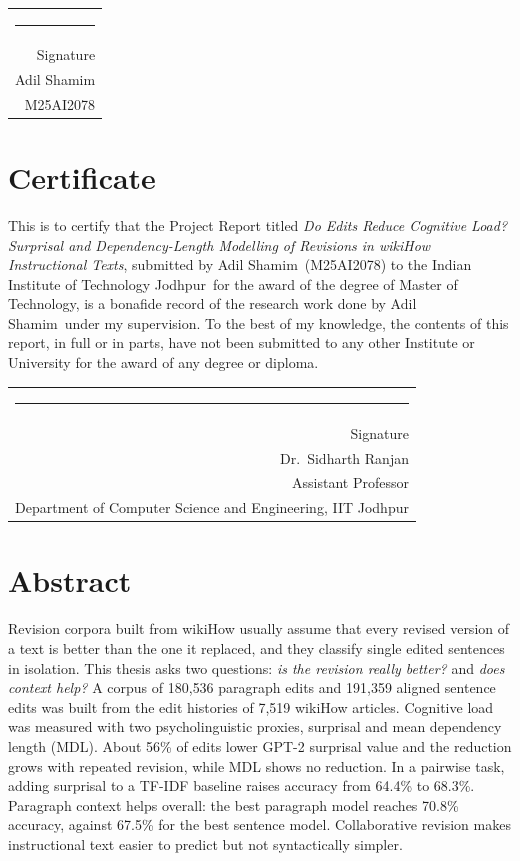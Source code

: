 \documentclass[12pt,a4paper,oneside]{report}
\newcommand{\thesistitleplain}{Do Edits Reduce Cognitive Load? Surprisal and Dependency-Length Modelling of Revisions in wikiHow Instructional Texts}
\newcommand{\authorname}{Adil Shamim}
\newcommand{\rollno}{M25AI2078}
\newcommand{\supervisor}{Dr.~Sidharth Ranjan}
\newcommand{\supervisordesignation}{Assistant Professor}
\newcommand{\supervisordept}{Department of Computer Science and Engineering}
\newcommand{\institute}{Indian Institute of Technology Jodhpur}
\newcommand{\degree}{Master of Technology}
\begin{document}
\vspace{2.5cm}
\begin{flushright}
\begin{tabular}{@{}r@{}}
\rule{6cm}{0.4pt}\\
Signature\\
\authorname\\
\rollno
\end{tabular}
\end{flushright}

\chapter*{Certificate}
This is to certify that the Project Report titled \emph{\thesistitleplain}, submitted by \authorname\ (\rollno) to the \institute\ for the award of the degree of \degree, is a bonafide record of the research work done by \authorname\ under my supervision. To the best of my knowledge, the contents of this report, in full or in parts, have not been submitted to any other Institute or University for the award of any degree or diploma.

\vspace{2.5cm}
\begin{flushright}
\begin{tabular}{@{}r@{}}
\rule{6cm}{0.4pt}\\
Signature\\
\supervisor\\
\supervisordesignation\\
\supervisordept, IIT Jodhpur
\end{tabular}
\end{flushright}

\chapter*{Abstract}
Revision corpora built from wikiHow usually assume that every revised version of a text is better than the one it replaced, and they classify single edited sentences in isolation. This thesis asks two questions: \emph{is the revision really better?} and \emph{does context help?} A corpus of 180{,}536 paragraph edits and 191{,}359 aligned sentence edits was built from the edit histories of 7{,}519 wikiHow articles. Cognitive load was measured with two psycholinguistic proxies, surprisal and mean dependency length (MDL). About 56\% of edits lower GPT-2 surprisal value and the reduction grows with repeated revision, while MDL shows no reduction. In a pairwise task, adding surprisal to a TF-IDF baseline raises accuracy from 64.4\% to 68.3\%. Paragraph context helps overall: the best paragraph model reaches 70.8\% accuracy, against 67.5\% for the best sentence model. Collaborative revision makes instructional text easier to predict but not syntactically simpler.
\end{document}
